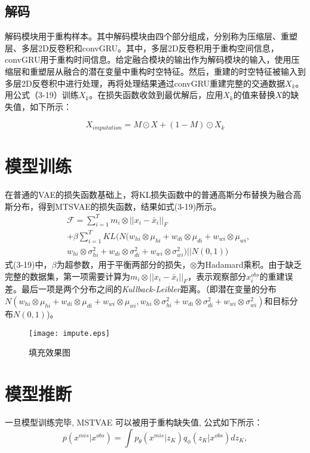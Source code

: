 \subsection{解码}
解码模块用于重构样本。其中解码模块由四个部分组成，分别称为压缩层、重塑层、多层2D反卷积和convGRU。其中，多层2D反卷积用于重构空间信息，convGRU用于重构时间信息。给定融合模块的输出作为解码模块的输入，使用压缩层和重塑层从融合的潜在变量中重构时空特征。然后，重建的时空特征被输入到多层2D反卷积中进行处理，再将处理结果通过convGRU重建完整的交通数据$X_k$。用公式（3-19）训练$X_k$。在损失函数收敛到最优解后，应用$X_k$的值来替换$X$的缺失值，如下所示：

\begin{equation}
X_{imputation}=M\odot X+(1-M)\odot X_k
\end{equation}

\section{模型训练}
在普通的VAE的损失函数基础上，将KL损失函数中的普通高斯分布替换为融合高斯分布，得到MTSVAE的损失函数，结果如式(3-19)所示。  
\begin{align}
&\mathcal{F}=\sum_{i=1}^{T}m_i\otimes||x_i-\bar{x}_i||_F\\
&+\beta\sum_{i=1}^{T}KL \Big(N(w_{hi}\otimes{\mu}_{hi}+w_{di}\otimes{\mu}_{di}+w_{wi}\otimes{\mu}_{wi},\nonumber\\
&w_{hi}\otimes{\sigma}_{hi}^2+w_{di}\otimes{\sigma}_{di}^2+w_{wi}\otimes{\sigma}_{wi}^2)||N(0,1) \Big)\nonumber
\end{align}
式(3-19)中，$\beta$为超参数，用于平衡两部分的损失，$\otimes$为Hadamard乘积。由于缺乏完整的数据集，第一项需要计算为$m_i\otimes||x_i-\bar{x}_i||_F$，表示观察部分$x_i^{obs}$的重建误差。最后一项是两个分布之间的\textit{Kullback-Leibler}距离。（即潜在变量的分布$N(w_{hi}\otimes{\mu}_{hi}+w_{di}\otimes{\mu}_{di}+w_{wi}\otimes{\mu}_{wi},w_{hi}\otimes{\sigma}_{hi}^2+w_{di}\otimes{\sigma}_{di}^2+w_{wi}\otimes{\sigma}_{wi}^2)$和目标分布$N(0,1)$)。
\begin{figure}[htbp] 
\centering
\texttt{[image: impute.eps]}
\vspace{-1em}
\caption{填充效果图 \label{impute}}
\end{figure}
\section{模型推断}
一旦模型训练完毕, MSTVAE 可以被用于重构缺失值, 公式如下所示：
\begin{equation}
p(x^{mis}|x^{obs}) = \int p_{\theta}(x^{mis}|z_{K})q_{\phi}(z_{K}|x^{obs}) dz_{K},	
\end{equation}

